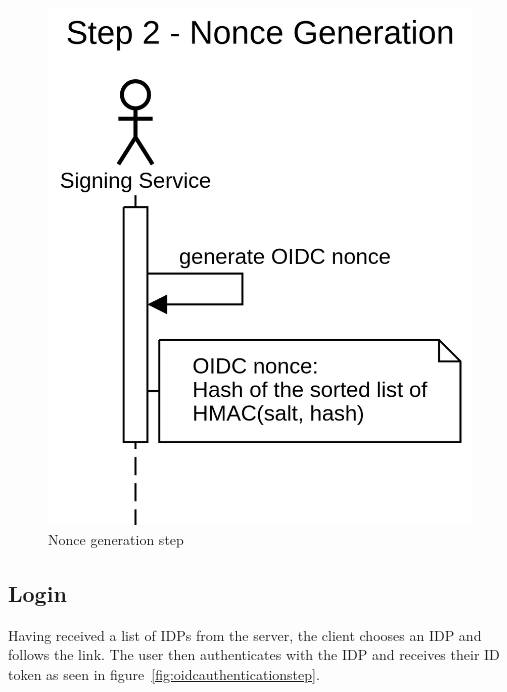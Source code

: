 \begin{figure}[H]
	\begin{center}
		\includegraphics[scale=0.5]{images/protocol_step2_nonce_generation.png}
		\caption{Nonce generation step}
		\label{fig:noncegenerationstep}
	\end{center}
\end{figure}

\subsection{Login}\label{subsec:login}

Having received a list of \gls{IDP}s from the server, the client chooses an \gls{IDP} and follows the link.
The user then authenticates with the \gls{IDP} and receives their ID token as seen in figure~\ref{fig:oidcauthenticationstep}.

